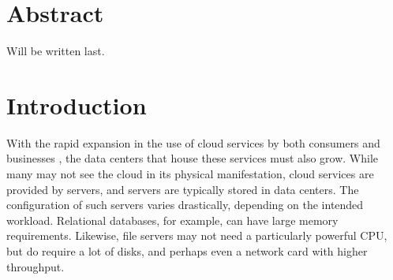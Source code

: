 \documentclass[11pt]{article}
\begin{document}
\newpage



    
    






\section*{Abstract}
Will be written last.

\section{Introduction} \label{sec:introduction}
	With the rapid expansion in the use of cloud services by both consumers and businesses \cite{Kushida2015}\cite{mokhtar2013}, the data centers that house these services must also grow. 
	While many may not see the cloud in its physical manifestation, cloud services are provided by servers, and servers are typically stored in data centers. 
	The configuration of such servers varies drastically, depending on the intended workload. 
	Relational databases, for example, can have large memory requirements. 
	Likewise, file servers may not need a particularly powerful CPU, but do require a lot of disks, and perhaps even a network card with higher throughput.
\end{document}
